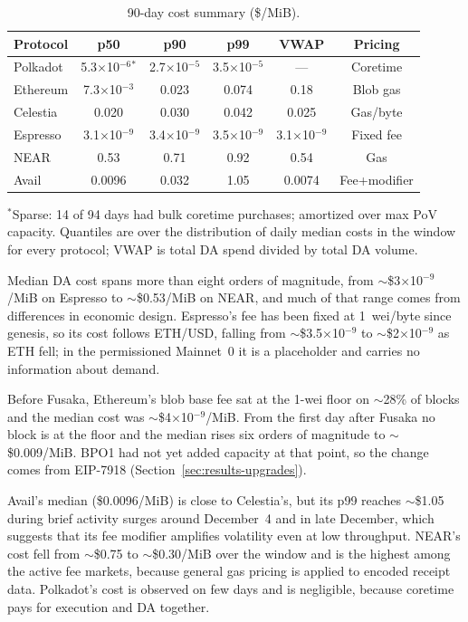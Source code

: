 \begin{table}[t]
\centering
\caption{90-day cost summary (\$/MiB).}
\label{tab:cost_summary}
\setlength{\tabcolsep}{2.5pt}
\footnotesize
\begin{tabular}{lccccc}
\toprule
\textbf{Protocol} & \textbf{p50} & \textbf{p90} & \textbf{p99} & \textbf{VWAP} & \textbf{Pricing} \\
\midrule
Polkadot & 5.3$\times$10$^{-6}$$^\ast$ & 2.7$\times$10$^{-5}$ & 3.5$\times$10$^{-5}$ & --- & Coretime \\
Ethereum & 7.3$\times$10$^{-3}$ & 0.023 & 0.074 & 0.18 & Blob gas \\
Celestia & 0.020 & 0.030 & 0.042 & 0.025 & Gas/byte \\
Espresso & 3.1$\times$10$^{-9}$ & 3.4$\times$10$^{-9}$ & 3.5$\times$10$^{-9}$ & 3.1$\times$10$^{-9}$ & Fixed fee \\
NEAR & 0.53 & 0.71 & 0.92 & 0.54 & Gas \\
Avail & 0.0096 & 0.032 & 1.05 & 0.0074 & Fee+modifier \\
\bottomrule
\end{tabular}

\vspace{2pt}
\raggedright\footnotesize{$^\ast$Sparse: 14 of 94 days had bulk coretime purchases; amortized over max PoV capacity. Quantiles are over the distribution of daily median costs in the window for every protocol; VWAP is total DA spend divided by total DA volume.}
\end{table}

Median DA cost spans more than eight orders of magnitude, from $\sim$\$3$\times$10$^{-9}$/MiB on Espresso to $\sim$\$0.53/MiB on NEAR, and much of that range comes from differences in economic design.
Espresso's fee has been fixed at 1~wei/byte since genesis, so its cost follows ETH/USD, falling from $\sim$\$3.5$\times$10$^{-9}$ to $\sim$\$2$\times$10$^{-9}$ as ETH fell; in the permissioned Mainnet~0 it is a placeholder and carries no information about demand.

Before Fusaka, Ethereum's blob base fee sat at the 1-wei floor on $\sim$28\% of blocks and the median cost was $\sim$\$4$\times$10$^{-9}$/MiB.
From the first day after Fusaka no block is at the floor and the median rises six orders of magnitude to $\sim$\$0.009/MiB.
BPO1 had not yet added capacity at that point, so the change comes from EIP-7918 (Section~\ref{sec:results-upgrades}).

Avail's median (\$0.0096/MiB) is close to Celestia's, but its p99 reaches $\sim$\$1.05 during brief activity surges around December~4 and in late December, which suggests that its fee modifier amplifies volatility even at low throughput.
NEAR's cost fell from $\sim$\$0.75 to $\sim$\$0.30/MiB over the window and is the highest among the active fee markets, because general gas pricing is applied to encoded receipt data.
Polkadot's cost is observed on few days and is negligible, because coretime pays for execution and DA together.

